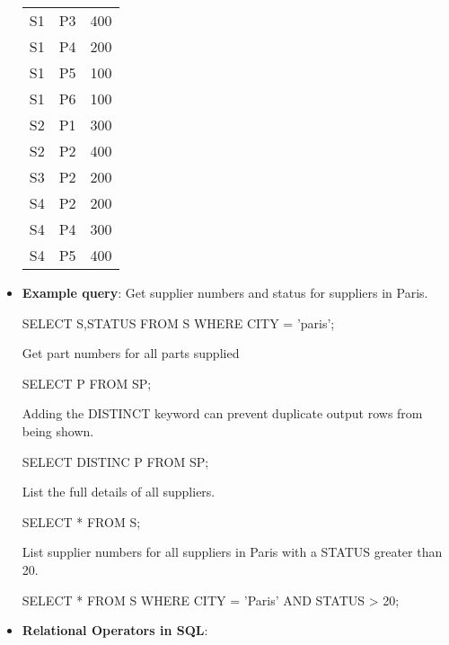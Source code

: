 \documentclass{report}
\begin{document}
\begin{itemize}
\begin{center}
\begin{tabular}{c|c|c}
                    S1 &P3 &400 \\
                    S1 &P4 &200 \\
                    S1 &P5 &100 \\
                    S1 &P6 &100 \\
                    S2 &P1 &300 \\
                    S2 &P2 &400 \\
                    S3 &P2 &200 \\
                    S4 &P2 &200 \\
                    S4 &P4 &300 \\
                    S4 &P5 &400
                \end{tabular}
            \end{center}
        \item \textbf{Example query}: 
            \bigbreak \noindent 
            Get supplier numbers and status for suppliers in Paris.
            \bigbreak \noindent 
            \begin{sqlcode}
            SELECT S,STATUS
                FROM S
                WHERE CITY = 'paris';
            \end{sqlcode}
            \bigbreak \noindent 
            Get part numbers for all parts supplied
            \bigbreak \noindent 
            \begin{sqlcode}
            SELECT P FROM SP;
            \end{sqlcode}
            \bigbreak \noindent 
            Adding the DISTINCT keyword can prevent duplicate output rows from being shown.
            \bigbreak \noindent 
            \begin{sqlcode}
            SELECT DISTINC P
                FROM SP;
            \end{sqlcode}
            \bigbreak \noindent 
            List the full details of all suppliers.
            \bigbreak \noindent 
            \begin{sqlcode}
            SELECT * FROM S;
            \end{sqlcode}
            \bigbreak \noindent 
            List supplier numbers for all suppliers in Paris with a STATUS greater than 20.
            \bigbreak \noindent 
            \begin{sqlcode}
            SELECT * FROM S 
                WHERE CITY = 'Paris' AND 
                    STATUS > 20;
            \end{sqlcode}
        \item \textbf{Relational Operators in SQL}:

\end{itemize}
\end{document}

